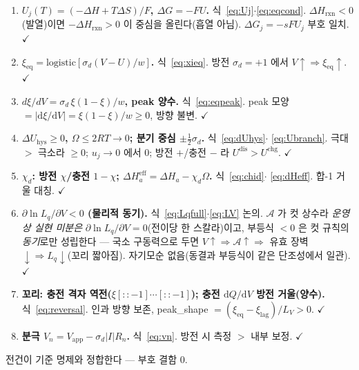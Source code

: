 \documentclass[11pt,a4paper]{article}
\newcommand{\dd}{\mathrm{d}}
\newcommand{\eff}{\mathrm{eff}}
\newcommand{\eq}{\mathrm{eq}}
\newcommand{\app}{\mathrm{app}}
\newcommand{\rxn}{\mathrm{rxn}}
\newcommand{\dis}{\mathrm{dis}}
\newcommand{\chg}{\mathrm{chg}}
\newcommand{\hys}{\mathrm{hys}}
\begin{document}
\begin{enumerate}[label=\textbf{S\arabic*.},leftmargin=2.6em,itemsep=2pt]
\item \textbf{$U_j(T)=(-\Delta H+T\Delta S)/F$, $\Delta G=-FU$.} 식~\eqref{eq:Uj}$\cdot$\eqref{eq:eqcond}. $\Delta H_\rxn<0$
(발열)이면 $-\Delta H_\rxn>0$ 이 중심을 올린다(흡열 아님). $\Delta G_j=-sFU_j$ 부호 일치. $\checkmark$
\item \textbf{$\xi_\eq=\mathrm{logistic}[\sigma_d(V-U)/w]$.} 식~\eqref{eq:xieq}. 방전 $\sigma_d=+1$ 에서
$V\!\uparrow\Rightarrow\xi_\eq\!\uparrow$. $\checkmark$
\item \textbf{$d\xi/dV=\sigma_d\,\xi(1-\xi)/w$, peak 양수.} 식~\eqref{eq:eqpeak}. peak 모양 $=|\dd\xi/\dd V|=
\xi(1-\xi)/w\ge0$, 방향 불변. $\checkmark$
\item \textbf{$\Delta U_\hys\ge0$, $\Omega\le2RT\to0$; 분기 중심 $\pm\tfrac12\sigma_d$.} 식~\eqref{eq:dUhys}$\cdot$
\eqref{eq:Ubranch}. 극대 $>$ 극소라 $\ge0$; $u_j\to0$ 에서 $0$; 방전 $+$/충전 $-$ 라 $U^{\dis}>U^{\chg}$. $\checkmark$
\item \textbf{$\chi_d$: 방전 $\chi$/충전 $1-\chi$; $\Delta H_a^\eff=\Delta H_a-\chi_d\Omega$.} 식~\eqref{eq:chid}$\cdot$
\eqref{eq:dHeff}. 합-1 거울 대칭. $\checkmark$
\item \textbf{$\partial\ln L_q/\partial V<0$ (물리적 동기).} 식~\eqref{eq:Lqfull}$\cdot$\eqref{eq:LV} 논의. $\mathcal A$ 가
컷 상수라 \emph{운영상 실현 미분은} $\partial\ln L_q/\partial V=0$(전이당 한 스칼라)이고, 부등식 $<0$ 은 컷 규칙의
\emph{동기}로만 성립한다 — 국소 구동력으로 두면 $V\!\uparrow\Rightarrow\mathcal A\!\uparrow\Rightarrow$ 유효 장벽
$\downarrow\Rightarrow L_q\downarrow$(꼬리 짧아짐). 자기모순 없음(동결과 부등식이 같은 단조성에서 일관). $\checkmark$
\item \textbf{꼬리: 충전 격자 역전($\xi[::-1]\cdots[::-1]$); 충전 $\dd Q/\dd V$ 방전 거울(양수).} 식~\eqref{eq:reversal}.
인과 방향 보존, peak\_shape $=(\xi_\eq-\xi_\mathrm{lag})/L_V>0$. $\checkmark$
\item \textbf{분극 $V_n=V_\app-\sigma_d|I|R_n$.} 식~\eqref{eq:vn}. 방전 시 측정 $>$ 내부 보정. $\checkmark$
\end{enumerate}
전건이 기준 명제와 정합한다 — 부호 결함 $0$.
\end{document}
